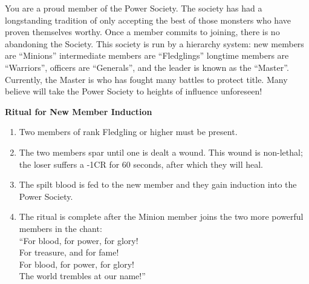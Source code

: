 \documentclass[green]{guildcamp2}
\begin{document}
\name{\gnewmemberpower{}}

You are a proud member of the Power Society. The society has had a longstanding tradition of only accepting the best of those monsters who have proven themselves worthy. Once a member commits to joining, there is no abandoning the Society. This society is run by a hierarchy system: new members are ``Minions'' intermediate members are ``Fledglings'' longtime members are ``Warriors'', officers are ``Generals'', and the leader is known as the ``Master''. Currently, the Master is \cRed{} who has fought many battles to protect \cRed{\their} title. Many believe \cRed{} will take the Power Society to heights of influence unforeseen!

{\bf Ritual for New Member Induction}
\begin{enumerate}
\item Two members of rank Fledgling or higher must be present.
\item The two members spar until one is dealt a wound. This wound is non-lethal; the loser suffers a -1CR for 60 seconds, after which they will heal. 
\item The spilt blood is fed to the new member and they gain induction into the Power Society.
\item The ritual is complete after the Minion member joins the two more powerful members in the chant:\\ ``For blood, for power, for glory!\\For treasure, and for fame!\\For blood, for power, for glory!\\The world trembles at our name!''
\end{enumerate}
\end{document}
